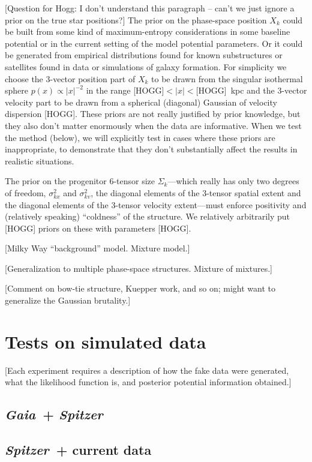 \documentclass[letterpaper,12pt,preprint]{aastex}
\newcommand{\project}[1]{\textsl{#1}}
\newcommand{\gaia}{\project{Gaia}~}
\newcommand{\spitzer}{\project{Spitzer}~}
\begin{document}
[Question for Hogg: I don't understand this paragraph -- can't we just ignore a prior on the true star positions?]
The prior on the phase-space position $X_k$ could be built from some
kind of maximum-entropy considerations in some baseline potential or
in the current setting of the model potential parameters.  Or it could
be generated from empirical distributions found for known substructures or
satellites found in data or simulations of galaxy formation.  For
simplicity we choose the 3-vector position part of $X_k$ to be drawn
from the singular isothermal sphere $p(x)\propto |x|^{-2}$ in the
range [HOGG]$<|x|<$[HOGG]~kpc and the 3-vector velocity part to be
drawn from a spherical (diagonal) Gaussian of velocity dispersion
[HOGG].  These priors are not really justified by prior knowledge, but
they also don't matter enormously when the data are informative.  When
we test the method (below), we will explicitly test in cases where
these priors are inappropriate, to demonstrate that they don't
substantially affect the results in realistic situations.

The prior on the progenitor 6-tensor size $\Sigma_k$---which really
has only two degrees of freedom, $\sigma_{kx}^2$ and $\sigma_{kv}^2$, the
diagonal elements of the 3-tensor spatial extent and the diagonal
elements of the 3-tensor velocity extent---must enforce positivity and
(relatively speaking) ``coldness'' of the structure.  We relatively
arbitrarily put [HOGG] priors on these with parameters [HOGG].

[Milky Way ``background'' model.  Mixture model.]

[Generalization to multiple phase-space structures. Mixture of
  mixtures.]

[Comment on bow-tie structure, Kuepper work, and so on;
  might want to generalize the Gaussian brutality.]

\section{Tests on simulated data}

[Each experiment requires a description of how the fake data were
  generated, what the likelihood function is, and posterior potential
  information obtained.]

\subsection{\gaia + \spitzer}

\subsection{\spitzer + current data}
\end{document}

